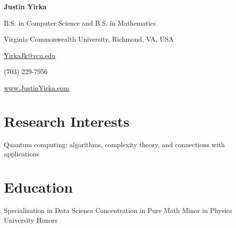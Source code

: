 \documentclass[11pt,letterpaper,serif]{moderncv}
\begin{document}
	
	
\thispagestyle{firstpage}

\begin{center}
	{\huge\textbf{Justin Yirka}}
		
	B.S. in Computer Science and B.S. in Mathematics
	
	Virginia Commonwealth University, Richmond, VA, USA
	\vspace{\baselineskip}
	
	\href{mailto:yirkajk@vcu.edu}{YirkaJk@vcu.edu}
	
	(703) 229-7956
	
	\url{www.JustinYirka.com}	
\end{center}


\setlength{\parskip}{0.5em}
\setlength\bibitemsep{\parskip}


\section{Research Interests}
Quantum computing: algorithms, complexity theory, and connections with applications


\section{Education}
\vspace{-\baselineskip}\vspace{-\parskip}
{	
	\begin{adjustwidth}{.25in}{}
		Specialization in Data Science \newline
		Concentration in Pure Math \newline 
		Minor in Physics \newline
		University Honors
	\end{adjustwidth}
}
\end{document}
